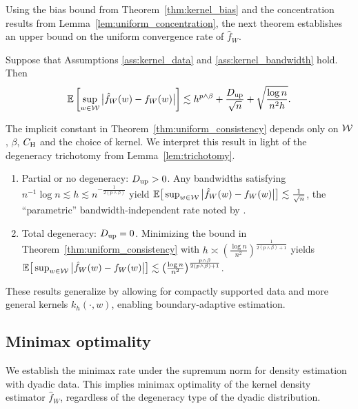 Using the bias bound from Theorem~\ref{thm:kernel_bias} and
the concentration results from Lemma~\ref{lem:uniform_concentration},
the next theorem establishes an upper bound on the uniform convergence rate of
$\hat f_W$.
%
\begin{theorem}%
  \label{thm:uniform_consistency}%
  Suppose that Assumptions \ref{ass:kernel_data} and
  \ref{ass:kernel_bandwidth} hold. Then
  \begin{align*}
    \mathbb{E}\left[
      \sup_{w \in \mathcal{W}}
      \big|\hat{f}_W(w) - f_W(w)\big|
    \right]
    \lesssim
    h^{p\wedge\beta} + \frac{D_{\textup{up}}}{\sqrt n} + \sqrt{\frac{\log n}{n^2h}}.
  \end{align*}
\end{theorem}
%
The implicit constant in Theorem~\ref{thm:uniform_consistency} depends only on
$\mathcal{W}$, $\beta$, $C_{\mathrm{H}}$ and the choice of kernel. We interpret this result in
light of the degeneracy trichotomy from Lemma~\ref{lem:trichotomy}.
%
\begin{enumerate}[label=(\roman*)]
  \item Partial or no degeneracy: $D_{\textup{up}} > 0$.
    Any bandwidths satisfying
    $n^{-1} \log n \lesssim h \lesssim n^{-\frac{1}{2(p\wedge\beta)}}$ yield
    $\mathbb{E}\big[\sup_{w \in \mathcal{W}}\big|\hat f_W(w)
    - f_W(w)\big| \big] \lesssim \frac{1}{\sqrt n}$, the ``parametric''
    bandwidth-independent rate noted by \citet{graham2024kernel}.

  \item Total degeneracy: $D_{\textup{up}} = 0$.
    Minimizing the bound in Theorem~\ref{thm:uniform_consistency} with
    $h \asymp \left( \frac{\log n}{n^2} \right)^{\frac{1}{2(p\wedge\beta)+1}}$
    yields $\mathbb{E}\big[ \sup_{w \in \mathcal{W}} \big|\hat f_W(w) - f_W(w)\big| \big]
    \lesssim
    \big(\frac{\log n}{n^2} \big)^{\frac{p\wedge\beta}{2(p\wedge\beta)+1}}$.
\end{enumerate}

These results generalize \citet*[Theorem~1]{chiang2020empirical}
by allowing for compactly supported data and more general kernels
$k_h(\cdot,w)$, enabling boundary-adaptive estimation.

\subsection{Minimax optimality}

We establish the minimax rate under the supremum norm for density estimation
with dyadic data. This implies minimax optimality of the kernel density
estimator $\hat f_W$, regardless of the degeneracy type of the dyadic
distribution.


